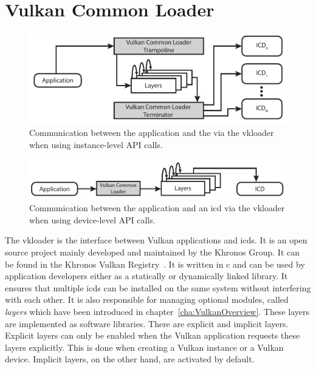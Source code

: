   \section{Vulkan Common Loader}
  \label{sec:VulkanLoader}
    \begin{figure}
      \includegraphics[width=\textwidth]{Main/Images/VulkanLoaderInstanceLayers}
      \centering
      \caption{Communication between the application and the  via the \gls{vkloader} when using instance-level API calls.}
      \label{fig:VulkanLoaderWithInstanceLayers}
    \end{figure}

    \begin{figure}
      \includegraphics[width=\textwidth]{Main/Images/VulkanLoaderDeviceLayers}
      \centering
      \caption{Communication between the application and an \acrfull{icd} via the \gls{vkloader} when using device-level API calls.}
      \label{fig:VulkanLoaderWithDeviceLayers}
    \end{figure}

    The \gls{vkloader} is the interface between Vulkan applications and \glspl{icd}.
    It is an open source project mainly developed and maintained by the Khronos Group.
    It can be found in the Khronos Vulkan Registry~\cite{vulkanregistry}.
    It is written in \gls{c} and can be used by application developers either as a statically or dynamically linked library.
    It ensures that multiple \glspl{icd} can be installed on the same system without interfering with each other.
    It is also responsible for managing optional modules, called \textit{layers} which have been introduced in chapter~\ref{cha:VulkanOverview}.
    These layers are implemented as software libraries.
    There are explicit and implicit layers.
    Explicit layers can only be enabled when the Vulkan application requests these layers explicitly.
    This is done when creating a Vulkan instance or a Vulkan device.
    Implicit layers, on the other hand, are activated by default.

